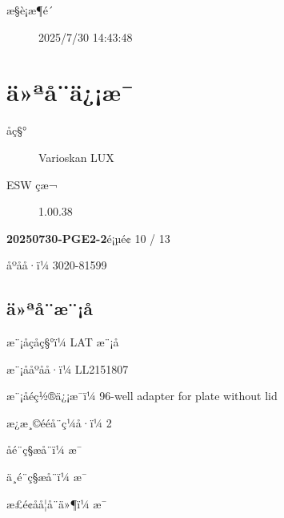 \documentclass[UTF8,10pt,a4paper,fontset=fandol]{ctexart}
\newcommand{\fieldvalue}[1]{#1}
\begin{document}
\begin{center}
\begin{center}
\begin{description}
\item[æ§è¡æ¶é´]
\fieldvalue{2025/7/30 14:43:48}
\end{description}

\section*{ä»ªå¨ä¿¡æ¯}

\begin{description}
\item[åç§°]
\fieldvalue{Varioskan LUX}

\item[ESW çæ¬]
\fieldvalue{1.00.38}
\end{description}

\newpage

\noindent\textbf{20250730-PGE2-2}\hfill é¡µé¢ 10 / 13

\vspace{1em}

\noindent
åºåå·ï¼%
\fieldvalue{3020-81599}

\subsection*{ä»ªå¨æ¨¡å}

\noindent
æ¨¡åçåç§°ï¼%
\fieldvalue{LAT æ¨¡å}

\noindent
æ¨¡ååºåå·ï¼%
\fieldvalue{LL2151807}

\noindent
æ¨¡åéç½®ä¿¡æ¯ï¼%
\fieldvalue{96-well adapter for plate without lid}

\noindent
æ¿æ¸©ééå¨ç¼å·ï¼%
\fieldvalue{2}

\noindent
åé¨ç§æå¨ï¼%
\fieldvalue{æ¯}

\noindent
ä¸é¨ç§æå¨ï¼%
\fieldvalue{æ¯}

\noindent
æ­£é¢åå­¦å¨ä»¶ï¼%
\fieldvalue{æ¯}


\end{center}
\end{center}
\end{document}
